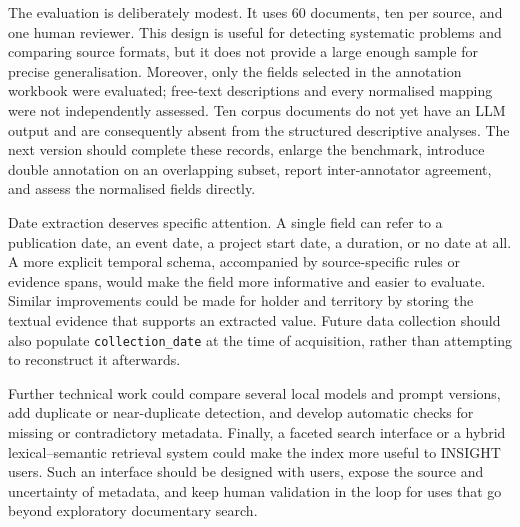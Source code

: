 The evaluation is deliberately modest. It uses 60 documents, ten per source,
and one human reviewer. This design is useful for detecting systematic
problems and comparing source formats, but it does not provide a large enough
sample for precise generalisation. Moreover, only the fields selected in the
annotation workbook were evaluated; free-text descriptions and every
normalised mapping were not independently assessed. Ten corpus documents do
not yet have an LLM output and are consequently absent from the structured
descriptive analyses. The next version should complete these records, enlarge
the benchmark, introduce double annotation on an overlapping subset, report
inter-annotator agreement, and assess the normalised fields directly.

Date extraction deserves specific attention. A single field can refer to a
publication date, an event date, a project start date, a duration, or no date
at all. A more explicit temporal schema, accompanied by source-specific rules
or evidence spans, would make the field more informative and easier to
evaluate. Similar improvements could be made for holder and territory by
storing the textual evidence that supports an extracted value. Future data
collection should also populate \texttt{collection\_date} at the time of
acquisition, rather than attempting to reconstruct it afterwards.

Further technical work could compare several local models and prompt versions,
add duplicate or near-duplicate detection, and develop automatic checks for
missing or contradictory metadata. Finally, a faceted search interface or a
hybrid lexical--semantic retrieval system could make the index more useful to
INSIGHT users. Such an interface should be designed with users, expose the
source and uncertainty of metadata, and keep human validation in the loop for
uses that go beyond exploratory documentary search.
